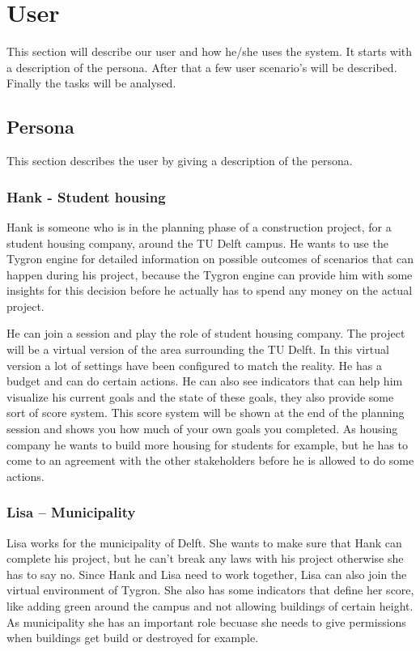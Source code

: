 \appendix

\section{User}
This section will describe our user and how he/she uses the system. 
It starts with a description of the persona. 
After that a few user scenario's will be described.
Finally the tasks will be analysed.

\subsection{Persona}
This section describes the user by giving a description of the persona.
\subsubsection*{Hank - Student housing}
Hank is someone who is in the planning phase of a construction project, for a student housing company, around the TU Delft campus. He wants to use the Tygron engine for detailed information on possible outcomes of scenarios that can happen during his project, because the Tygron engine can provide him with some insights for this decision before he actually has to spend any money on the actual project. 

He can join a session and play the role of student housing company. The project will be a virtual version of the area surrounding the TU Delft. In this virtual version a lot of settings have been configured to match the reality. He has a budget and can do certain actions. He can also see indicators that can help him visualize his current goals and the state of these goals, they also provide some sort of score system. This score system will be shown at the end of the planning session and shows you how much of your own goals you completed. As housing company he wants to build more housing for students for example, but he has to come to an agreement with the other stakeholders before he is allowed to do some actions.

\subsubsection*{Lisa – Municipality}
Lisa works for the municipality of Delft. She wants to make sure that Hank can complete his project, but he can’t break any laws with his project otherwise she has to say no. Since Hank and Lisa need to work together, Lisa can also join the virtual environment of Tygron. She also has some indicators that define her score, like adding green around the campus and not allowing buildings of certain height. As municipality she has an important role becuase she needs to give permissions when buildings get build or destroyed for example.

